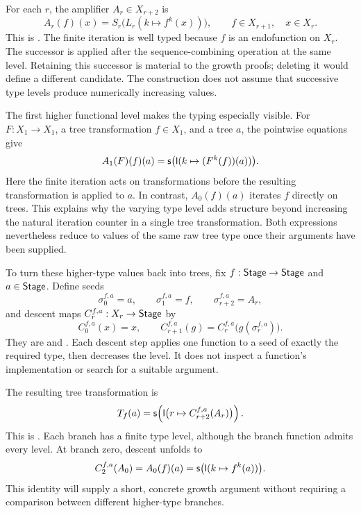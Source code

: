 For each \(r\), the amplifier \(A_r\in X_{r+2}\) is
\begin{equation}\label{eq:typed-amplifier}
 A_r(f)(x)=S_r\bigl(L_r(k\mapsto f^k(x))\bigr),
 \qquad f\in X_{r+1},\quad x\in X_r.
\end{equation}
This is . The finite iteration is well typed
because \(f\) is an endofunction on \(X_r\). The successor is applied
after the sequence-combining operation at the same level. Retaining this
successor is material to the growth proofs; deleting it would define a
different candidate. The construction does not assume that successive
type levels produce numerically increasing values.

The first higher functional level makes the typing especially visible.
For \(F:X_1\to X_1\), a tree transformation \(f\in X_1\), and a tree
\(a\), the pointwise equations give
\[
 A_1(F)(f)(a)=
       \mathsf s\bigl(\mathsf l(k\mapsto(F^k(f))(a))\bigr).
\]
Here the finite iteration acts on transformations before the resulting
transformation is applied to \(a\). In contrast, \(A_0(f)(a)\) iterates
\(f\) directly on trees. This explains why the varying type level adds
structure beyond increasing the natural iteration counter in a single
tree transformation. Both expressions nevertheless reduce to values of
the same raw tree type once their arguments have been supplied.

To turn these higher-type values back into trees, fix
\(f:\mathsf{Stage}\to\mathsf{Stage}\) and \(a\in\mathsf{Stage}\). Define seeds
\[
 \sigma^{f,a}_0=a,\qquad
 \sigma^{f,a}_1=f,\qquad
 \sigma^{f,a}_{r+2}=A_r,
\]
and descent maps \(C^{f,a}_r:X_r\to\mathsf{Stage}\) by
\[
 C^{f,a}_0(x)=x,\qquad
 C^{f,a}_{r+1}(g)=C^{f,a}_r\bigl(g(\sigma^{f,a}_r)\bigr).
\]
They are  and . Each descent step
applies one function to a seed of exactly the required type, then
decreases the level. It does not inspect a function's implementation
or search for a suitable argument.

The resulting tree transformation is
\begin{equation}\label{eq:higher-tower}
 T_f(a)=\mathsf s\!\left(
    \mathsf l\bigl(r\mapsto C^{f,a}_{r+2}(A_r)\bigr)\right).
\end{equation}
This is . Each branch has a finite type level,
although the branch function admits every level. At branch zero,
descent unfolds to
\[
 C^{f,a}_2(A_0)=A_0(f)(a)
              =\mathsf s\bigl(\mathsf l(k\mapsto f^k(a))\bigr).
\]
This identity will supply a short, concrete growth argument without
requiring a comparison between different higher-type branches.

